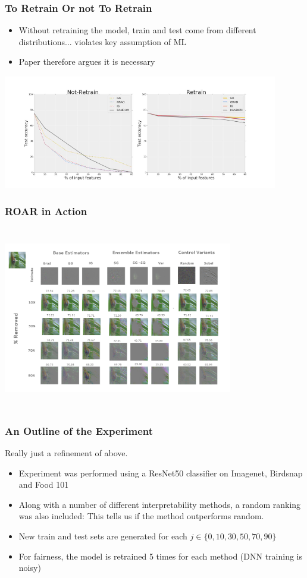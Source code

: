 \documentclass{beamer}
\theoremstyle{mystyle}
\begin{document}
\begin{frame}
	\frametitle{To Retrain Or not To Retrain}
	\begin{itemize}
	\item Without retraining the model, train and test come from different distributions... violates key assumption of ML
	\item Paper therefore argues it is necessary
	\end{itemize}
	\includegraphics[width=12cm, height=5cm]{retrain_vs_not.png}
\end{frame}
\begin{frame}
	\frametitle{ROAR in Action}
	\includegraphics[height=8cm, width=10cm]{ROAR_methods.png}
\end{frame}
\begin{frame}
	\frametitle{An Outline of the Experiment}
	Really just a refinement of above.
	\begin{itemize}
		\item Experiment was performed using a ResNet50 classifier on Imagenet, Birdsnap and Food 101\pause
		\item Along with a number of different interpretability methods, a random ranking was also included: This tells us if the method outperforms random.\pause
		\item  New train and test sets are generated for each $j \in \{0,10,30,50,70,90\} $\pause
		\item For fairness, the model is retrained 5 times for each method (DNN training is noisy) \pause
	\end{itemize}
\end{frame}
\end{document}
